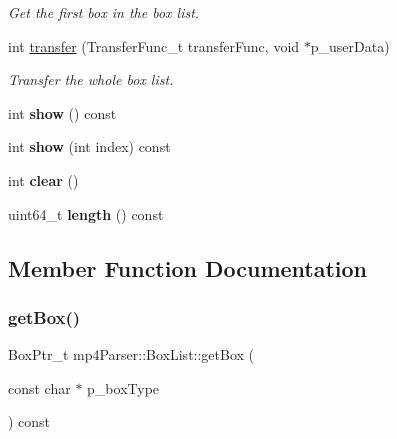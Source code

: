 \begin{DoxyCompactItemize}
\begin{DoxyCompactList}\small\item\em Get the first box in the box list. \end{DoxyCompactList}\item 
int \mbox{\hyperlink{classmp4_parser_1_1_box_list_a81f1fd91e205e558a4ac89c481179483}{transfer}} (Transfer\+Func\+\_\+t transfer\+Func, void $\ast$p\+\_\+user\+Data)
\begin{DoxyCompactList}\small\item\em Transfer the whole box list. \end{DoxyCompactList}\item 
\mbox{\label{classmp4_parser_1_1_box_list_a92a1d673426cd0529d42d6e36aff70a5}} 
int {\bfseries show} () const
\item 
\mbox{\label{classmp4_parser_1_1_box_list_a24658953697e507b3d92663372853499}} 
int {\bfseries show} (int index) const
\item 
\mbox{\label{classmp4_parser_1_1_box_list_a477e2897d99578461e78c938955b57de}} 
int {\bfseries clear} ()
\item 
\mbox{\label{classmp4_parser_1_1_box_list_a4a8a5e53fe9c70504fd4831b54ec0923}} 
uint64\+\_\+t {\bfseries length} () const
\end{DoxyCompactItemize}


\subsection{Member Function Documentation}
\mbox{\label{classmp4_parser_1_1_box_list_a0cb719a35dca3955405798beb065c7ce}} 
\subsubsection{\texorpdfstring{getBox()}{getBox()}}
{\footnotesize\ttfamily Box\+Ptr\+\_\+t mp4\+Parser\+::\+Box\+List\+::get\+Box (\begin{DoxyParamCaption}\item[{const char $\ast$}]{p\+\_\+box\+Type }\end{DoxyParamCaption}) const}



